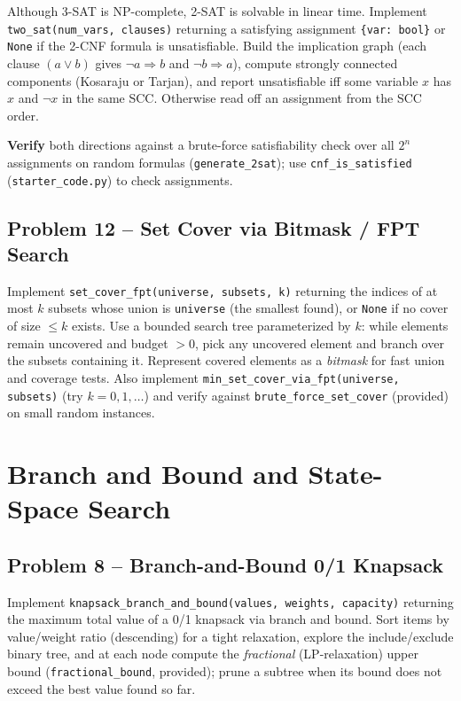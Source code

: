 \documentclass[11pt]{article}
\begin{document}
Although 3-SAT is NP-complete, 2-SAT is solvable in linear time. Implement
\texttt{two\_sat(num\_vars, clauses)} returning a satisfying assignment
\texttt{\{var: bool\}} or \texttt{None} if the 2-CNF formula is unsatisfiable.
Build the implication graph (each clause $(a \lor b)$ gives $\lnot a \Rightarrow
b$ and $\lnot b \Rightarrow a$), compute strongly connected components (Kosaraju
or Tarjan), and report unsatisfiable iff some variable $x$ has $x$ and $\lnot x$
in the same SCC. Otherwise read off an assignment from the SCC order.

\textbf{Verify} both directions against a brute-force satisfiability check over
all $2^n$ assignments on random formulas (\texttt{generate\_2sat}); use
\texttt{cnf\_is\_satisfied} (\texttt{starter\_code.py}) to check assignments.

\subsection*{Problem 12 -- Set Cover via Bitmask / FPT Search}

Implement \texttt{set\_cover\_fpt(universe, subsets, k)} returning the indices of
at most $k$ subsets whose union is \texttt{universe} (the smallest found), or
\texttt{None} if no cover of size $\le k$ exists. Use a bounded search tree
parameterized by $k$: while elements remain uncovered and budget $> 0$, pick any
uncovered element and branch over the subsets containing it. Represent covered
elements as a \emph{bitmask} for fast union and coverage tests. Also implement
\texttt{min\_set\_cover\_via\_fpt(universe, subsets)} (try $k=0,1,\dots$) and
verify against \texttt{brute\_force\_set\_cover} (provided) on small random
instances.

\newpage
\section{Branch and Bound and State-Space Search}

\subsection*{Problem 8 -- Branch-and-Bound 0/1 Knapsack}

Implement \texttt{knapsack\_branch\_and\_bound(values, weights, capacity)}
returning the maximum total value of a 0/1 knapsack via branch and bound. Sort
items by value/weight ratio (descending) for a tight relaxation, explore the
include/exclude binary tree, and at each node compute the \emph{fractional}
(LP-relaxation) upper bound (\texttt{fractional\_bound}, provided); prune a
subtree when its bound does not exceed the best value found so far.
\end{document}
